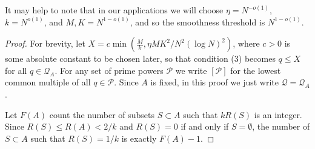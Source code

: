 \documentclass[12pt]{amsart}
\begin{document}
It may help to note that in our applications we will choose $\eta=N^{-o(1)}$, $k=N^{o(1)}$, and $M,K=N^{1-o(1)}$, and so the smoothness threshold is $N^{1-o(1)}$. 

\begin{proof}
For brevity, let $X= c\min(\frac{M}{k},\eta MK^2/N^2(\log N)^2)$, where $c>0$ is some absolute constant to be chosen later, so that condition (3) becomes $q\leq X$ for all $q\in\mathcal{Q}_A$. For any set of prime powers $\mathcal{P}$ we write $[\mathcal{P}]$ for the lowest common multiple of all $q\in\mathcal{P}$. Since $A$ is fixed, in this proof we just write $\mathcal{Q}=\mathcal{Q}_A$.

Let $F(A)$ count the number of subsets $S\subset A$ such that $kR(S)$ is an integer. Since $R(S)\leq R(A)<2/k$ and $R(S)=0$ if and only if $S=\emptyset$, the number of $S\subset A$ such that $R(S)=1/k$ is exactly $F(A)-1$.


\end{proof}
\end{document}
